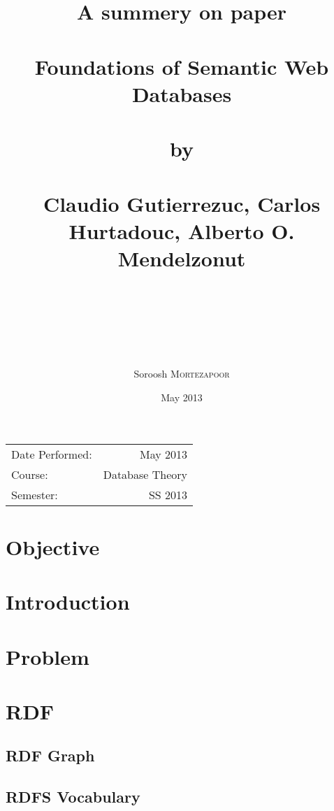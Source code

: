 \documentclass[10pt]{article}
\title{A summery on paper \\ \\ {\bf Foundations of Semantic Web Databases}\\ \\by \\ \\ Claudio Gutierrezuc, Carlos Hurtadouc, Alberto O. Mendelzonut \\ \\ \\ \\} %
\author{Soroosh \textsc{Mortezapoor}} %
\date{May 2013} %
\begin{document}
\maketitle %

\begin{center}
\begin{tabular}{l r}
Date Performed: & May 2013 \\ %
Course: & Database Theory \\ %
Semester: & SS 2013 %
\end{tabular}
\end{center}



\section{Objective}



\section{Introduction}


\section{Problem}



\section{RDF}

\subsection{RDF Graph}


\subsection{RDFS Vocabulary}
\end{document}

